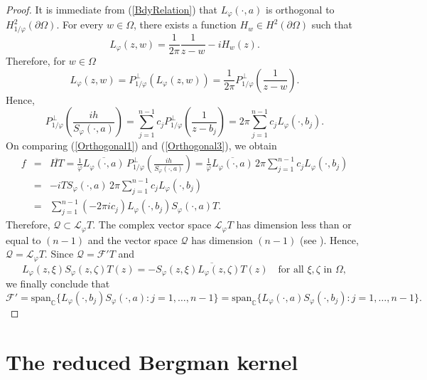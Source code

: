 \documentclass[11pt, reqno]{amsart}
\numberwithin{equation}{section}
\begin{document}
\begin{proof}
It is immediate from (\ref{BdyRelation}) that $L_{\varphi}(\cdot,a)$ is orthogonal to $H^2_{1/\varphi}(\partial\Omega)$. For every $w\in\Omega$, there exists a function $H_w\in H^2(\partial\Omega)$ such that
\[
L_{\varphi}(z,w) = \frac{1}{2\pi}\frac{1}{z-w} - i H_w(z).
\]
Therefore, for $w\in\Omega$
\begin{equation}
L_{\varphi}(z,w) = P^{\perp}_{1/\varphi} (L_{\varphi}(z,w)) = \frac{1}{2\pi} P^{\perp}_{1/\varphi} \left(\frac{1}{z-w}\right).
\end{equation}
Hence, 
\begin{equation}\label{Orthogonal3}
P^{\perp}_{1/\varphi} \left(\frac{i h}{S_{\varphi}(\cdot,a)}\right) = \sum_{j=1}^{n-1} c_j P^{\perp}_{1/\varphi}\left(\frac{1}{z-b_j}\right) = 2\pi\sum_{j=1}^{n-1} c_j L_{\varphi}(\cdot,b_j).
\end{equation}
On comparing (\ref{Orthogonal1}) and (\ref{Orthogonal3}), we obtain
\begin{eqnarray*}
f
&=&
\overline{HT} 
=
\frac{1}{\varphi} \overline{L_{\varphi}(\cdot,a)} \,P^{\perp}_{1/\varphi} \left(\frac{i h}{S_{\varphi}(\cdot,a)}\right) 
=
\frac{1}{\varphi} \overline{L_{\varphi}(\cdot,a)} \,2\pi\sum_{j=1}^{n-1} c_j L_{\varphi}(\cdot,b_j)\\
&=&
-i T S_{\varphi}(\cdot,a)\,2\pi\sum_{j=1}^{n-1} c_j L_{\varphi}(\cdot,b_j)\\
&=&
\sum_{j=1}^{n-1}(-2\pi i c_j) L_{\varphi}(\cdot,b_j)S_{\varphi}(\cdot,a) T.
\end{eqnarray*}
Therefore, $\mathcal{Q}\subset \mathcal{L}_{\varphi}T$. The complex vector space $\mathcal{L}_{\varphi}T$ has dimension less than or equal to $(n-1)$ and the vector space $\mathcal{Q}$ has dimension $(n-1)$ (see \cite{Be0}). Hence, $\mathcal{Q}=\mathcal{L}_{\varphi}T$. Since $\mathcal{Q}=\mathcal{F}'T$ and 
\[
L_{\varphi}(z,\xi) S_{\varphi}(z,\zeta) T(z)= -\overline{S_{\varphi}(z,\xi) L_{\varphi}(z,\zeta) T(z)}\quad \text{for all }\xi, \zeta \text{ in }\Omega,
\]
we finally conclude that
\[
\mathcal{F}'=\text{span}_{\mathbb{C}}\{L_{\varphi}(\cdot,b_j)S_{\varphi}(\cdot,a) : j=1,\ldots,n-1\} = \text{span}_{\mathbb{C}}\{L_{\varphi}(\cdot,a)S_{\varphi}(\cdot,b_j) : j=1,\ldots,n-1\}. 
\]
\end{proof}

\section{The reduced Bergman kernel}\label{Reduced_Bergman}
\end{document}
